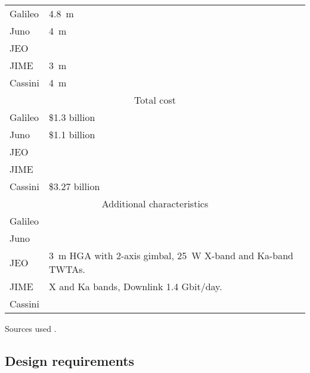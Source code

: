 \begin{longtable}{lp{}}
  Galileo & \SI{4.8}{m} \\

  Juno & \SI{4}{m} \\

  JEO & \\

  JIME & \SI{3}{m} \\

  Cassini & \SI{4}{m} \\

  \multicolumn{2}{c}{Total cost} \\ \midrule

  Galileo & \$1.3 billion \\

  Juno & \$1.1 billion \\

  JEO & \\

  JIME & \\

  Cassini & \$3.27 billion \\

  \multicolumn{2}{c}{Additional characteristics} \\ \midrule

  Galileo & \\

  Juno & \\

  JEO & \SI{3}{m} HGA with 2-axis gimbal, \SI{25}{W} X-band and
  Ka-band TWTAs. \\

  JIME & X and Ka bands, Downlink 1.4 Gbit/day. \\

  Cassini & \\
\end{longtable}

Sources used
\cite{nasagalileo, jplgalileo,nasajuno,nasajeo, esajuice,
esajuicespacecraft,nasacassinisheet,nasacassinioverview}.



\subsection{Design requirements}

